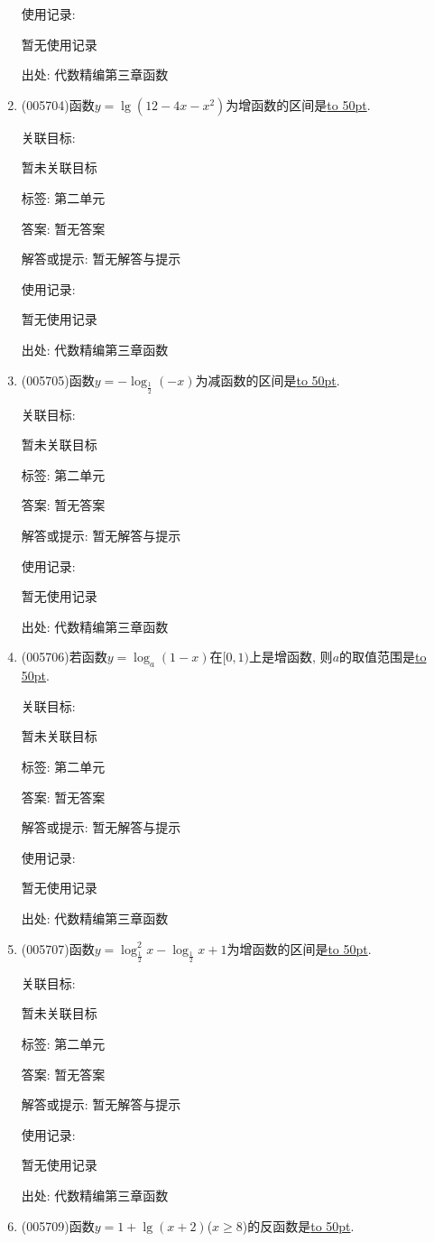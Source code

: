 \documentclass[10pt,a4paper]{article}
\newcommand{\blank}[1]{\underline{\hbox to #1pt{}}}
\begin{document}
\begin{enumerate}[1.]
使用记录:

暂无使用记录


出处: 代数精编第三章函数
\item { (005704)}函数$y=\lg (12-4x-x^2)$为增函数的区间是\blank{50}.


关联目标:

暂未关联目标



标签: 第二单元

答案: 暂无答案

解答或提示: 暂无解答与提示

使用记录:

暂无使用记录


出处: 代数精编第三章函数
\item { (005705)}函数$y=-\log_{\frac 12}(-x)$为减函数的区间是\blank{50}.


关联目标:

暂未关联目标



标签: 第二单元

答案: 暂无答案

解答或提示: 暂无解答与提示

使用记录:

暂无使用记录


出处: 代数精编第三章函数
\item { (005706)}若函数$y=\log_a(1-x)$在$[0,1)$上是增函数, 则$a$的取值范围是\blank{50}.


关联目标:

暂未关联目标



标签: 第二单元

答案: 暂无答案

解答或提示: 暂无解答与提示

使用记录:

暂无使用记录


出处: 代数精编第三章函数
\item { (005707)}函数$y=\log_{\frac 12}^2x-\log_{\frac 12}x+1$为增函数的区间是\blank{50}.


关联目标:

暂未关联目标



标签: 第二单元

答案: 暂无答案

解答或提示: 暂无解答与提示

使用记录:

暂无使用记录


出处: 代数精编第三章函数
\item { (005709)}函数$y=1+\lg (x+2)$($x\ge 8$)的反函数是\blank{50}.



\end{enumerate}
\end{document}
